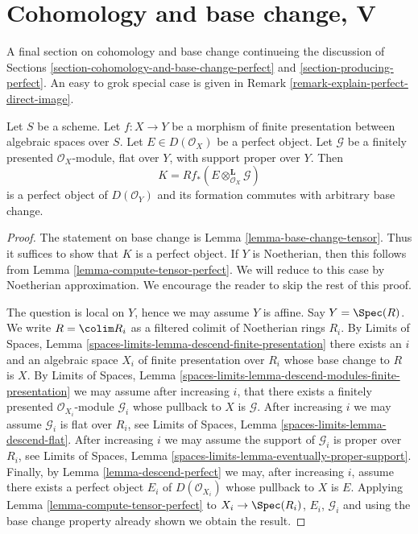 \section{Cohomology and base change, V}
\label{section-cohomology-and-base-change-final}

\noindent
A final section on cohomology and base change continueing
the discussion of Sections
\ref{section-cohomology-and-base-change-perfect}
and \ref{section-producing-perfect}.
An easy to grok special case is given in
Remark \ref{remark-explain-perfect-direct-image}.

\begin{lemma}
\label{lemma-base-change-tensor-perfect}
Let $S$ be a scheme. Let $f : X \to Y$ be a morphism of finite presentation
between algebraic spaces over $S$. Let $E \in D(\mathcal{O}_X)$ be a perfect
object. Let $\mathcal{G}$ be a finitely presented $\mathcal{O}_X$-module,
flat over $Y$, with support proper over $Y$. Then
$$
K = Rf_*(E \otimes_{\mathcal{O}_X}^\mathbf{L} \mathcal{G})
$$
is a perfect object of $D(\mathcal{O}_Y)$ and its formation
commutes with arbitrary base change.
\end{lemma}

\begin{proof}
The statement on base change is Lemma \ref{lemma-base-change-tensor}.
Thus it suffices to show that $K$ is a perfect object. If $Y$ is
Noetherian, then this follows from
Lemma \ref{lemma-compute-tensor-perfect}.
We will reduce to this case by Noetherian approximation.
We encourage the reader to skip the rest of this proof.

\medskip\noindent
The question is local on $Y$, hence we may assume $Y$ is affine.
Say $Y = \Spec(R)$. We write $R = \colim R_i$ as a filtered colimit
of Noetherian rings $R_i$. By Limits of Spaces, Lemma
\ref{spaces-limits-lemma-descend-finite-presentation}
there exists an $i$ and an algebraic space $X_i$ of finite presentation
over $R_i$ whose base change to $R$ is $X$. By
Limits of Spaces, Lemma
\ref{spaces-limits-lemma-descend-modules-finite-presentation}
we may assume after increasing $i$, that there exists a finitely
presented $\mathcal{O}_{X_i}$-module $\mathcal{G}_i$ whose
pullback to $X$ is $\mathcal{G}$. After increasing $i$
we may assume $\mathcal{G}_i$ is flat over $R_i$, see
Limits of Spaces, Lemma
\ref{spaces-limits-lemma-descend-flat}.
After increasing $i$ we may assume the support of $\mathcal{G}_i$
is proper over $R_i$, see
Limits of Spaces, Lemma \ref{spaces-limits-lemma-eventually-proper-support}.
Finally, by Lemma \ref{lemma-descend-perfect}
we may, after increasing $i$, assume there exists a perfect
object $E_i$ of $D(\mathcal{O}_{X_i})$ whose pullback to
$X$ is $E$. Applying Lemma \ref{lemma-compute-tensor-perfect}
to $X_i \to \Spec(R_i)$, $E_i$, $\mathcal{G}_i$ and using the
base change property already shown we obtain the result.
\end{proof}

